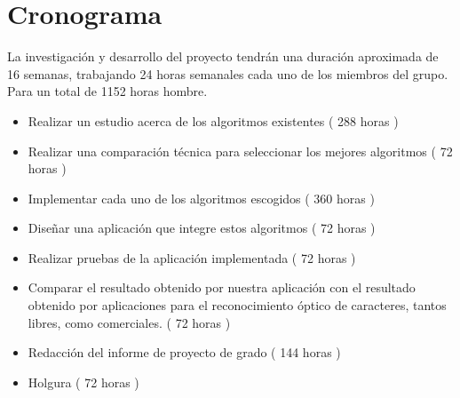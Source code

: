 \documentclass[a4paper, 11pt, oneside]{article}
\begin{document}
	\section{Cronograma}
	La investigación y desarrollo del proyecto tendrán una duración aproximada de 16 semanas,
	trabajando 24 horas semanales cada uno de los miembros del grupo. Para un total de 1152
	horas hombre.
	\begin{itemize}
	\item Realizar un estudio acerca de los algoritmos existentes ( 288 horas )
	\item Realizar una comparación técnica para seleccionar los mejores algoritmos ( 72 horas )
	\item Implementar cada uno de los algoritmos escogidos ( 360 horas )
	\item Diseñar una aplicación que integre estos algoritmos ( 72 horas )
	\item Realizar pruebas de la aplicación implementada ( 72 horas )
	\item Comparar el resultado obtenido por nuestra aplicación con el resultado obtenido por aplicaciones para el reconocimiento óptico de caracteres, tantos libres, como comerciales. ( 72 horas )
	\item Redacción del informe de proyecto de grado ( 144 horas )
	\item Holgura ( 72 horas )
	\end{itemize}
	\clearpage
	


\nocite{*}
\end{document}
